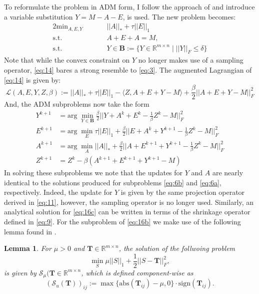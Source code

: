 \documentclass{article}
\newtheorem{lemma}[theorem]{Lemma}
\begin{document}
To reformulate the problem in ADM form, I follow the approach of \cite{Wright} and introduce a variable substitution $Y = M - A - E$, is used.  The new problem becomes:
 \begin{alignat}{2} \label{eq:14}
\textrm{min}_{A,E,Y}& \quad &&||A||_* + \tau ||E||_1\\
\textrm{s.t.}& &&A + E + A = M, \nonumber \\
\textrm{s.t.}& && Y \in \textbf{B} := \{ Y \in \mathbb{R}^{m \times n} \; | \; ||Y||_F \le \delta \} \nonumber
\end{alignat}
Note that while the convex constraint on $Y$ no longer makes use of a sampling operator, \ref{eq:14} bares a strong resemble to \ref{eq:3}.  The augmented Lagrangian of \ref{eq:14} is given by:
\begin{equation}
\mathcal{L}(A,E,Y,Z,\beta) := ||A||_* + \tau ||E||_1 - \langle Z, A + E + Y - M \rangle + \frac \beta 2 ||A + E + Y - M||^2_F
\end{equation}
And, the ADM subproblems now take the form
\begin{subequations}
\begin{align}
Y^{k+1} &= \textrm{arg} \; \min_{Y \in \textbf{B}} \frac \beta 2 ||Y + A^k + E^k - \frac 1 \beta Z^k - M||^2_F \label{eq:16a}\\
E^{k+1} &= \textrm{arg} \; \min_{E} \tau ||E||_1 + \frac \beta 2 ||E + A^k + Y^{k+1} - \frac 1 \beta Z^k - M||^2_F \label{eq:16b}\\
A^{k+1} &= \textrm{arg} \; \min_{A} ||A||_* + \frac \beta 2 ||A + E^{k+1} + Y^{k+1} - \frac 1 \beta Z^k - M||^2_F \label{eq:16c}\\
Z^{k+1} &= Z^k - \beta \left( A^{k+1} + E^{k+1} + Y^{k+1} - M \right) \label{eq:16d}
\end{align} 
\end{subequations}
In solving these subproblems we note that the updates for $Y$ and $A$ are nearly identical to the solutions produced for subproblems \ref{eq:6b} and \ref{eq:6a}, respectively.  Indeed, the update for $Y$ is given by the same projection operator derived in \ref{eq:11}, however, the sampling operator is no longer used.  Similarly, an analytical solution for \ref{eq:16c} can be written in terms of the shrinkage operator defined in \ref{eq:9}.    For the subproblem of \ref{eq:16b} we make use of the following lemma found in \cite{Tao}. 
\begin{lemma}
For $\mu > 0$ and $\textbf{T} \in \mathbb{R}^{m \times n}$, the solution of the follwoing problem
$$
\min_S \mu ||S||_1 + \frac 1 2||S-\textbf{T}||^2_F,
$$
is given by $\mathcal{S}_\mu(\textbf{T} \in \mathbb{R}^{m \times n}$, which is defined component-wise as 
$$
( \mathcal{S}_u( \textbf{T} ) )_{ij} := \max \{ \textrm{abs}(\textbf{T}_{ij}) - \mu, 0 \} \cdot \textrm{sign} (\textbf{T}_{ij}).
$$
\end{lemma}
\end{document}
